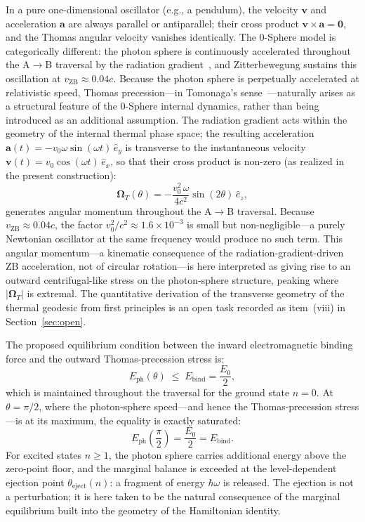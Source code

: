 \documentclass[%
 reprint, amsmath,amssymb, aps, prb, ]{revtex4-2}
\numberwithin{equation}{section}
\newcommand{\iphase}{\theta}
\begin{document}
In a pure one-dimensional oscillator (e.g., a pendulum), the velocity $\mathbf{v}$ and acceleration $\mathbf{a}$ are always parallel or antiparallel; their cross product $\mathbf{v} \times \mathbf{a} = \mathbf{0}$, and the Thomas angular velocity vanishes identically. The 0-Sphere model is categorically different: the photon sphere is continuously accelerated throughout the A$\to$B traversal by the radiation gradient~\cite{hanamura01}, and Zitterbewegung sustains this oscillation at $v_{\text{ZB}} \approx 0.04c$. Because the photon sphere is perpetually accelerated at relativistic speed, Thomas precession---in Tomonaga's sense~\cite{Tomonaga1997}---naturally arises as a structural feature of the 0-Sphere internal dynamics, rather than being introduced as an additional assumption. The radiation gradient acts within the geometry of the internal thermal phase space; the resulting acceleration $\mathbf{a}(t) = -v_0\omega\sin(\omega t)\,\hat{e}_y$ is transverse to the instantaneous velocity $\mathbf{v}(t) = v_0\cos(\omega t)\,\hat{e}_x$, so that their cross product is non-zero (as realized in the present construction):
\begin{equation}
\boldsymbol{\Omega}_T(\iphase) = -\frac{v_0^2\,\omega}{4c^2}\sin(2\iphase)\,\hat{e}_z,
\label{eq:thomas_AV}
\end{equation}
generates angular momentum throughout the A$\to$B traversal. Because $v_{\text{ZB}} \approx 0.04c$, the factor $v_0^2/c^2 \approx 1.6 \times 10^{-3}$ is small but non-negligible---a purely Newtonian oscillator at the same frequency would produce no such term. This angular momentum---a kinematic consequence of the radiation-gradient-driven ZB acceleration, not of circular rotation---is here interpreted as giving rise to an outward centrifugal-like stress on the photon-sphere structure, peaking where $|\boldsymbol{\Omega}_T|$ is extremal. The quantitative derivation of the transverse geometry of the thermal geodesic from first principles is an open task recorded as item~(viii) in Section~\ref{sec:open}.

The proposed equilibrium condition between the inward electromagnetic binding force and the outward Thomas-precession stress is:
\begin{equation}
E_{\text{ph}}(\iphase) \;\leq\; E_{\text{bind}} = \frac{E_0}{2},
\label{eq:equilibrium}
\end{equation}
which is maintained throughout the traversal for the ground state $n=0$. At $\iphase = \pi/2$, where the photon-sphere speed---and hence the Thomas-precession stress---is at its maximum, the equality is exactly saturated:
\begin{equation}
E_{\text{ph}}\!\left(\frac{\pi}{2}\right) = \frac{E_0}{2} = E_{\text{bind}}.
\label{eq:ejection_threshold}
\end{equation}
For excited states $n \geq 1$, the photon sphere carries additional energy above the zero-point floor, and the marginal balance is exceeded at the level-dependent ejection point $\iphase_{\text{eject}}(n)$: a fragment of energy $\hbar\omega$ is released. The ejection is not a perturbation; it is here taken to be the natural consequence of the marginal equilibrium built into the geometry of the Hamiltonian identity.
\end{document}
